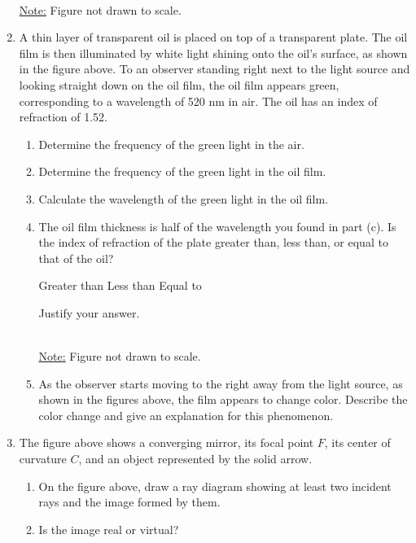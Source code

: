 \documentclass{../../../oss-classkick}
\begin{document}
\begin{enumerate}[leftmargin=15pt]
  \begin{center}
    \\
    \underline{Note:} Figure not drawn to scale.
  \end{center}
\item A thin layer of transparent oil is placed on top of a transparent plate.
  The oil film is then illuminated by white light shining onto the oil's
  surface, as shown in the figure above. To an observer standing right next to
  the light source and looking straight down on the oil film, the oil film
  appears green, corresponding to a wavelength of 520 nm in air. The oil has an
  index of refraction of 1.52.
  \begin{enumerate}
  \item Determine the frequency of the green light in the air.
  \item Determine the frequency of the green light in the oil film.
  \item Calculate the wavelength of the green light in the oil film.
  \item The oil film thickness is half of the wavelength you found in part (c).
    Is the index of refraction of the plate greater than, less than, or equal
    to that of the oil?

    \vspace{.1in}
    \underline{\hspace{.3in}} Greater than\hspace{.2in}
    \underline{\hspace{.3in}} Less than\hspace{.2in}
    \underline{\hspace{.3in}} Equal to
    
    \vspace{.1in}Justify your answer.

    \begin{center}
      \\
      \underline{Note:} Figure not drawn to scale.
    \end{center}
  \item As the observer starts moving to the right away from the light source,
    as shown in the figures above, the film appears to change color. Describe
    the color change and give an explanation for this phenomenon.
  \end{enumerate}
  \newpage

\item The figure above shows a converging mirror, its focal point $F$, its
  center of curvature $C$, and an object represented by the solid arrow.
  \begin{enumerate}
  \item On the figure above, draw a ray diagram showing at least two incident
    rays and the image formed by them.
  \item Is the image real or virtual?


\end{enumerate}
\end{enumerate}
\end{document}
